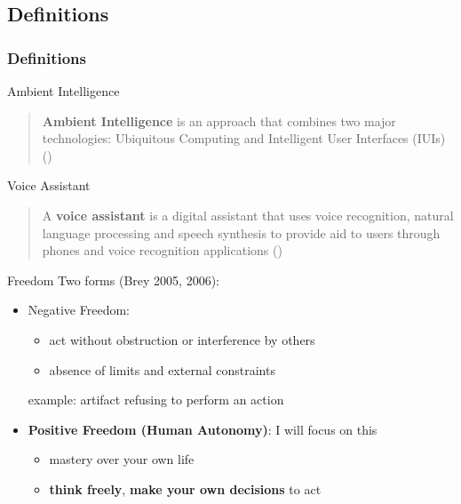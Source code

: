 \documentclass{beamer}
\begin{document}
\subsection{Definitions}
\begin{frame}[allowframebreaks]
\frametitle{Definitions}	
	\begin{block}{Ambient Intelligence}
		\begin{quote}
			\textbf{Ambient Intelligence} is an approach that combines two major technologies: Ubiquitous Computing and Intelligent User Interfaces (IUIs) (\cite{brey2005freedom})
		\end{quote}
	\end{block}

	\begin{block}{Voice Assistant}
		\begin{quote}
			A \textbf{voice assistant} is a digital assistant that uses voice recognition, natural language processing and speech synthesis to provide aid to users through phones and voice recognition applications (\cite{whatis})
		\end{quote}
	\end{block}
	\framebreak
	\begin{block}{Freedom}
		   Two forms (Brey 2005, 2006):
		   
			\begin{itemize}
				\item Negative Freedom:
					\begin{itemize}
						\item act without obstruction or interference by others
						\item absence of limits and external constraints
					\end{itemize}
				example: artifact refusing to perform an action
				    \bigskip
					\item {\small \textbf{Positive Freedom (Human Autonomy)}: I will focus on this}
						\begin{itemize}
							\item mastery over your own life
							\item \textbf{think freely}, \textbf{make your own decisions} to act
						\end{itemize}
			\end{itemize}
			
	\end{block}
\end{frame}
\end{document}
